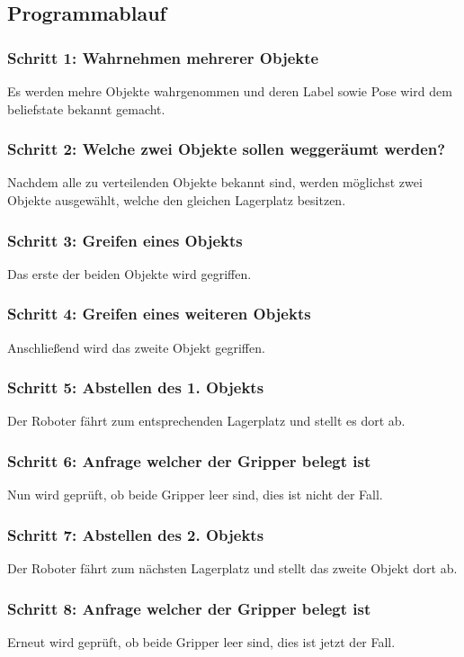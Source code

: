 \documentclass{suturo}
\begin{document}
\subsection*{Programmablauf}
\subsubsection{Schritt 1: Wahrnehmen mehrerer Objekte}
Es werden mehre Objekte wahrgenommen und deren Label sowie Pose wird dem beliefstate bekannt gemacht.

\subsubsection{Schritt 2: Welche zwei Objekte sollen weggeräumt werden?}
Nachdem alle zu verteilenden Objekte bekannt sind, werden möglichst zwei Objekte ausgewählt, welche den gleichen Lagerplatz besitzen.

\subsubsection{Schritt 3: Greifen eines Objekts}
Das erste der beiden Objekte wird gegriffen.

\subsubsection{Schritt 4: Greifen eines weiteren Objekts}
Anschließend wird das zweite Objekt gegriffen.

\subsubsection{Schritt 5: Abstellen des 1. Objekts}
Der Roboter fährt zum entsprechenden Lagerplatz und stellt es dort ab.

\subsubsection{Schritt 6: Anfrage welcher der Gripper belegt ist}
Nun wird geprüft, ob beide Gripper leer sind, dies ist nicht der Fall.

\subsubsection{Schritt 7: Abstellen des 2. Objekts}
Der Roboter fährt zum nächsten Lagerplatz und stellt das zweite Objekt dort ab.

\subsubsection{Schritt 8: Anfrage welcher der Gripper belegt ist}
Erneut wird geprüft, ob beide Gripper leer sind, dies ist jetzt der Fall.
\end{document}
